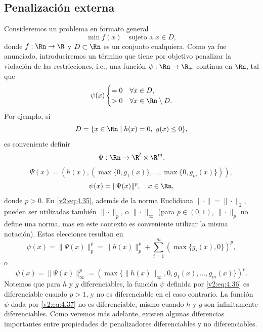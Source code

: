 \subsection{Penalización externa}\label{v2:sec:4.3.1}

Consideremos un problema en formato general
\begin{equation}
    \min f(x) \quad \text{sujeto a } x \in D,
    \label{v2:eq:4.31}
\end{equation}
donde $f : \Rn \to \R$ y $D \subset \Rn$ es un conjunto cualquiera. Como ya fue anunciado, introduciremos un término que tiene por objetivo penalizar la violación de las restricciones, i.e., una función $\psi : \Rn \to \R_+$ continua en $\Rn$, tal que
\begin{equation}
    \psi(x) \begin{cases} = 0 & \forall x \in D, \\ > 0 & \forall x \in \Rn \setminus D. \end{cases}
    \label{v2:eq:4.32}
\end{equation}
Por ejemplo, si
\begin{equation}
    D = \{x \in \Rn \mid h(x) = 0, \ g(x) \le 0\},
    \label{v2:eq:4.33}
\end{equation}
es conveniente definir
\[
    \Psi : \Rn \to \R^l \times \R^m,
\]
\begin{equation}
    \Psi(x) = (h(x), (\max\{0, g_1(x)\}, \dots, \max\{0, g_m(x)\})),
    \label{v2:eq:4.34}
\end{equation}
\begin{equation}
    \psi(x) = \|\Psi(x)\|^p, \quad x \in \Rn,
    \label{v2:eq:4.35}
\end{equation}
donde $p > 0$. En \eqref{v2:eq:4.35}, además de la norma Euclidiana $\|\cdot\| = \|\cdot\|_2$, pueden ser utilizadas también $\|\cdot\|_p$, o $\|\cdot\|_\infty$ (para $p \in (0, 1)$, $\|\cdot\|_p$ no define una norma, mas en este contexto es conveniente utilizar la misma notación). Estas elecciones resultan en
\begin{equation}
    \psi(x) = \|\Psi(x)\|_p^p = \|h(x)\|_p^p + \sum_{i=1}^m (\max\{g_i(x), 0\})^p,
    \label{v2:eq:4.36}
\end{equation}
o
\begin{equation}
    \psi(x) = \|\Psi(x)\|_\infty^p = (\max \{ \|h(x)\|_\infty, 0, g_1(x), \dots, g_m(x) \})^p.
    \label{v2:eq:4.37}
\end{equation}
Notemos que para $h$ y $g$ diferenciables, la función $\psi$ definida por \eqref{v2:eq:4.36} es diferenciable cuando $p > 1$, y no es diferenciable en el caso contrario. La función $\psi$ dada por \eqref{v2:eq:4.37} no es diferenciable, mismo cuando $h$ y $g$ son infinitamente diferenciables. Como veremos más adelante, existen algunas diferencias importantes entre propiedades de penalizadores diferenciables y no diferenciables.

